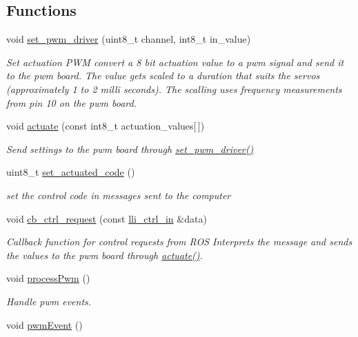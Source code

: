 \subsection*{Functions}
\begin{DoxyCompactItemize}
\item 
void \hyperlink{svea__arduino__src_8ino_adab070eb39b45b4c79b5d7e3cafa9514}{set\+\_\+pwm\+\_\+driver} (uint8\+\_\+t channel, int8\+\_\+t in\+\_\+value)
\begin{DoxyCompactList}\small\item\em Set actuation P\+WM convert a 8 bit actuation value to a pwm signal and send it to the pwm board. The value gets scaled to a duration that suits the servos (approximately 1 to 2 milli seconds). The scalling uses frequency measurements from pin 10 on the pwm board. \end{DoxyCompactList}\item 
void \hyperlink{svea__arduino__src_8ino_aa5545eb35f187e5fd11a483a265bed7b}{actuate} (const int8\+\_\+t actuation\+\_\+values\mbox{[}$\,$\mbox{]})
\begin{DoxyCompactList}\small\item\em Send settings to the pwm board through \hyperlink{svea__arduino__src_8ino_adab070eb39b45b4c79b5d7e3cafa9514}{set\+\_\+pwm\+\_\+driver()} \end{DoxyCompactList}\item 
uint8\+\_\+t \hyperlink{svea__arduino__src_8ino_ad7d57085af575cbb5dc21e523f3a3321}{set\+\_\+actuated\+\_\+code} ()\hypertarget{svea__arduino__src_8ino_ad7d57085af575cbb5dc21e523f3a3321}{}\label{svea__arduino__src_8ino_ad7d57085af575cbb5dc21e523f3a3321}

\begin{DoxyCompactList}\small\item\em set the control code in messages sent to the computer \end{DoxyCompactList}\item 
void \hyperlink{svea__arduino__src_8ino_ae79b6def446edd5a233efe74bc1f2a7b}{cb\+\_\+ctrl\+\_\+request} (const \hyperlink{svea__arduino__src_8h_a397644608f772ef60685f6a938f43ea1}{lli\+\_\+ctrl\+\_\+in} \&data)
\begin{DoxyCompactList}\small\item\em Callback function for control requests from R\+OS Interprets the message and sends the values to the pwm board through \hyperlink{svea__arduino__src_8ino_aa5545eb35f187e5fd11a483a265bed7b}{actuate()}. \end{DoxyCompactList}\item 
void \hyperlink{svea__arduino__src_8ino_af99fa97e441e842b197dacc4a1a95a99}{process\+Pwm} ()
\begin{DoxyCompactList}\small\item\em Handle pwm events. \end{DoxyCompactList}\item 
void \hyperlink{svea__arduino__src_8ino_a2948125fe6592c36c5c0e641478e2db0}{pwm\+Event} ()\hypertarget{svea__arduino__src_8ino_a2948125fe6592c36c5c0e641478e2db0}{}\label{svea__arduino__src_8ino_a2948125fe6592c36c5c0e641478e2db0}


\end{DoxyCompactItemize}
